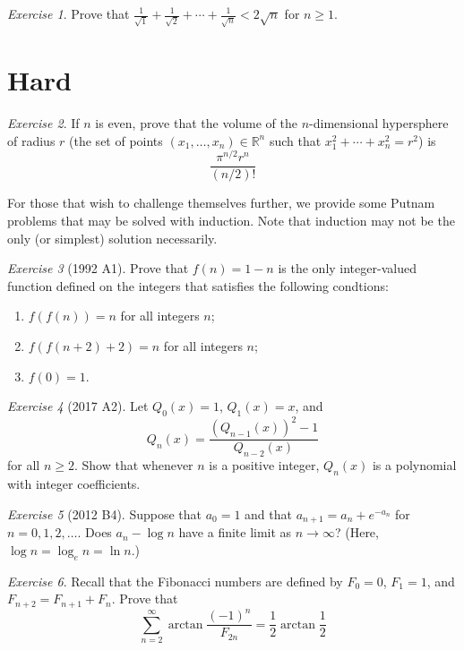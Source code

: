 \documentclass{article}
\theoremstyle{definition}
\theoremstyle{remark}
\newtheorem{exercise}{Exercise}
\newcommand{\RR}{\mathbb{R}}
\begin{document}
\begin{exercise}
    Prove that $\frac{1}{\sqrt{1}}+\frac{1}{\sqrt{2}}+\cdots+\frac{1}{\sqrt{n}}<2\sqrt{n}$ for $n\geq 1$.
\end{exercise}

\section{Hard}

\begin{exercise}
    If $n$ is even, prove that the volume of the $n$-dimensional hypersphere of radius $r$ (the set of points $(x_1,\dots,x_n)\in \RR^n$ such that $x_1^2+\cdots+x_n^2 = r^2$) is
    \[\frac{\pi^{n/2}r^n}{(n/2)!}\]
\end{exercise}

For those that wish to challenge themselves further, we provide some Putnam problems that may be solved with induction. Note that induction may not be the only (or simplest) solution necessarily.

\begin{exercise}[1992 A1]
    Prove that \(f(n)=1-n\) is the only integer-valued function defined on the integers that satisfies the following condtions:
    \begin{enumerate}
        \item \(f(f(n))=n\) for all integers \(n\);
        \item \(f(f(n+2)+2)=n\) for all integers \(n\);
        \item \(f(0)=1\).
    \end{enumerate}
\end{exercise}

\begin{exercise}[2017 A2]
    Let \(Q_0(x)=1\), \(Q_1(x)=x\), and
    \[Q_n(x)=\frac{(Q_{n-1}(x))^2-1}{Q_{n-2}(x)}\]
    for all \(n\geq 2\). Show that whenever \(n\) is a positive integer, \(Q_n(x)\) is a polynomial with integer coefficients.
\end{exercise}

\begin{exercise}[2012 B4]
    Suppose that \(a_0=1\) and that \(a_{n+1}=a_n+e^{-a_n}\) for \(n=0,1,2,\ldots\). Does \(a_n-\log n\) have a finite limit as \(n\to\infty\)? (Here, \(\log n=\log_en=\ln n\).)
\end{exercise}


\begin{exercise}
    Recall that the Fibonacci numbers are defined by $F_0=0$, $F_1=1$, and $F_{n+2}=F_{n+1}+F_n$. Prove that
    \[\sum_{n=2}^\infty \arctan\frac{(-1)^n}{F_{2n}} = \frac{1}{2}\arctan{\frac{1}{2}}\]
\end{exercise}
\end{document}
